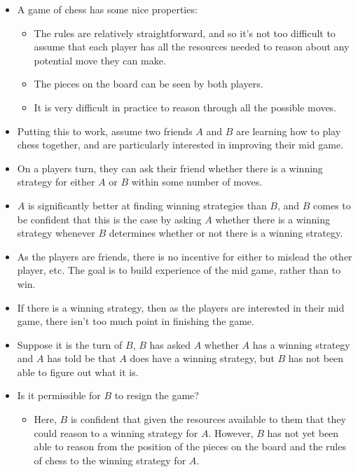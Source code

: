 \documentclass[10pt]{article}
\begin{document}
\begin{itemize}
\item A game of chess has some nice properties:
  \begin{itemize}
  \item The rules are relatively straightforward, and so it's not too difficult to assume that each player has all the resources needed to reason about any potential move they can make.
  \item The pieces on the board can be seen by both players.
  \item It is very difficult in practice to reason through all the possible moves.
  \end{itemize}
\item Putting this to work, assume two friends \(A\) and \(B\) are learning how to play chess together, and are particularly interested in improving their mid game.
\item On a players turn, they can ask their friend whether there is a winning strategy for either \(A\) or \(B\) within some number of moves.
\item \(A\) is significantly better at finding winning strategies than \(B\), and \(B\) comes to be confident that this is the case by asking \(A\) whether there is a winning strategy whenever \(B\) determines whether or not there is a winning strategy.
\item As the players are friends, there is no incentive for either to mislead the other player, etc.
  The goal is to build experience of the mid game, rather than to win.
\item If there is a winning strategy, then as the players are interested in their mid game, there isn't too much point in finishing the game.
\item Suppose it is the turn of \(B\), \(B\) has asked \(A\) whether \(A\) has a winning strategy and \(A\) has told be that \(A\) does have a winning strategy, but \(B\) has not been able to figure out what it is.
\item Is it permissible for \(B\) to resign the game?
  \begin{itemize}
  \item Here, \(B\) is confident that given the resources available to them that they could reason to a winning strategy for \(A\).
    However, \(B\) has not yet been able to reason from the position of the pieces on the board and the rules of chess to the winning strategy for \(A\).
  \end{itemize}
\end{itemize}
\end{document}
